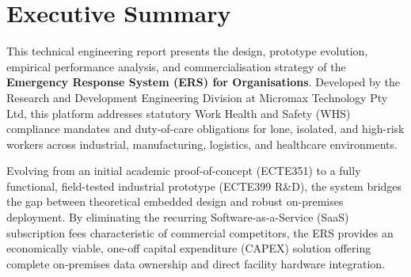 \chapter*{Executive Summary}

This technical engineering report presents the design, prototype evolution, empirical performance analysis, and commercialisation strategy of the \textbf{Emergency Response System (ERS) for Organisations}. Developed by the Research and Development Engineering Division at Micromax Technology Pty Ltd, this platform addresses statutory Work Health and Safety (WHS) compliance mandates and duty-of-care obligations for lone, isolated, and high-risk workers across industrial, manufacturing, logistics, and healthcare environments.

Evolving from an initial academic proof-of-concept (ECTE351) to a fully functional, field-tested industrial prototype (ECTE399 R\&D), the system bridges the gap between theoretical embedded design and robust on-premises deployment. By eliminating the recurring Software-as-a-Service (SaaS) subscription fees characteristic of commercial competitors, the ERS provides an economically viable, one-off capital expenditure (CAPEX) solution offering complete on-premises data ownership and direct facility hardware integration.

